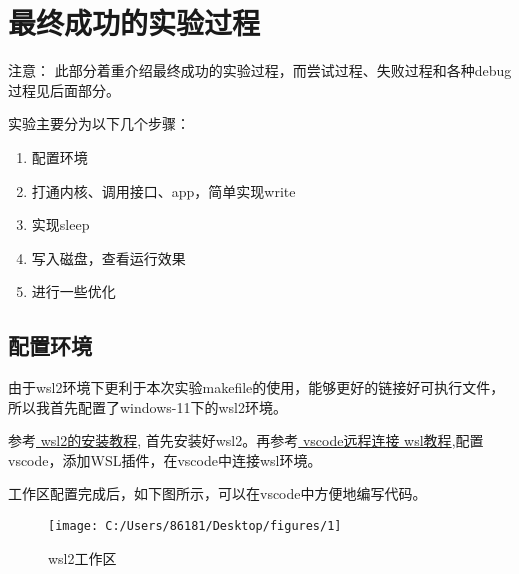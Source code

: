 \documentclass{LabReport}
\begin{document}
	
	\section{最终成功的实验过程}
	
	{\color{red} 注意：} 此部分着重介绍最终成功的实验过程，而尝试过程、失败过程和各种debug过程见后面部分。\par
	\hspace{0em}实验主要分为以下几个步骤：
	
	\begin{enumerate}
		\item 配置环境
		\item 打通内核、调用接口、app，简单实现write
		\item 实现sleep
		\item 写入磁盘，查看运行效果
		\item 进行一些优化
	\end{enumerate}
	
	\subsection{配置环境}
由于wsl2环境下更利于本次实验makefile的使用，能够更好的链接好可执行文件，所以我首先配置了windows-11下的wsl2环境。\par
\hspace{0em}参考\href{https://blog.csdn.net/xiaouncle/article/details/136910057?utm_medium=distribute.pc_relevant.none-task-blog-2~default~baidujs_baidulandingword~default-0-136910057-blog-114636422.235^v43^pc_blog_bottom_relevance_base8&spm=1001.2101.3001.4242.1&utm_relevant_index=3}{\color{blue} wsl2的安装教程}, 首先安装好wsl2。再参考\href{https://blog.csdn.net/mmc02/article/details/136142015?ops_request_misc=%257B%2522request%255Fid%2522%253A%2522171377421816777224417656%2522%252C%2522scm%2522%253A%252220140713.130102334.pc%255Fall.%2522%257D&request_id=171377421816777224417656&biz_id=0&utm_medium=distribute.pc_search_result.none-task-blog-2~all~first_rank_ecpm_v1~rank_v31_ecpm-5-136142015-null-null.142^v100^pc_search_result_base5&utm_term=wsl2%E5%A6%82%E4%BD%95%E5%AF%BC%E5%85%A5vscode&spm=1018.2226.3001.4187}{\color{blue} vscode远程连接 wsl教程},配置vscode，添加WSL插件，在vscode中连接wsl环境。\par
\hspace{0em}工作区配置完成后，如下图所示，可以在vscode中方便地编写代码。
\begin{figure}[h!]
	\centering
	\texttt{[image: C:/Users/86181/Desktop/figures/1]}
	\caption{wsl2工作区}
	\label{fig:1}
\end{figure}
\end{document}
